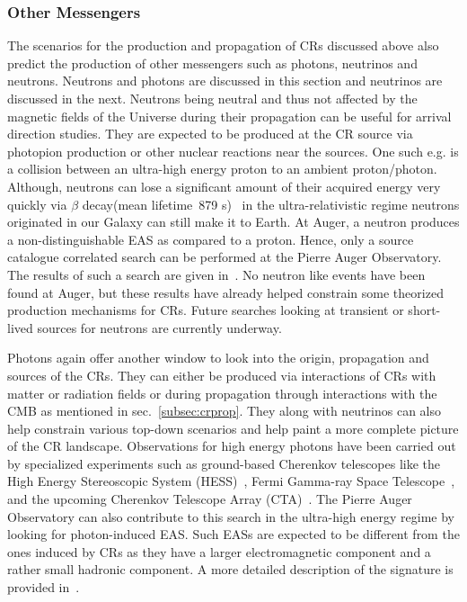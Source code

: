 \subsubsection*{Other Messengers}
\label{subsubsec:CRmessengers}
The scenarios for the production and propagation of CRs discussed above also predict the production of other messengers such as photons, neutrinos and neutrons. Neutrons and photons are discussed in this section and neutrinos are discussed in the next. 
Neutrons being neutral and thus not affected by the magnetic fields of the Universe during their propagation can be useful for arrival direction studies. They are expected to be produced at the CR source via photopion production or other nuclear reactions near the sources. One such e.g. is a collision between an ultra-high energy proton to an ambient proton/photon. Although, neutrons can lose a significant amount of their acquired energy very quickly via $\beta$ decay(mean lifetime~879 s)~\cite{ParticleDataGroup:2024cfk} in the ultra-relativistic regime neutrons originated in our Galaxy can still make it to Earth. At Auger, a neutron produces a non-distinguishable EAS as compared to a proton. Hence, only a source catalogue correlated search can be performed at the Pierre Auger Observatory. The results of such a search are given in~\cite{PierreAuger:2023onx}. No neutron like events have been found at Auger, but these results have already helped constrain some theorized production mechanisms for CRs. Future searches looking at transient or short-lived sources for neutrons are currently underway. 

Photons again offer another window to look into the origin, propagation and sources of the CRs. They can either be produced via interactions of CRs with matter or radiation fields or during propagation through interactions with the CMB as mentioned in sec.~\ref{subsec:crprop}. They along with neutrinos can also help constrain various top-down scenarios and help paint a more complete picture of the CR landscape. Observations for high energy photons have been carried out by specialized experiments such as ground-based Cherenkov telescopes like the High Energy Stereoscopic System (HESS)~\cite{Puhlhofer:2024fjx}, Fermi Gamma-ray Space Telescope~\cite{Thompson_2022}, and the upcoming Cherenkov Telescope Array (CTA)~\cite{2018_CTAO}. The Pierre Auger Observatory can also contribute to this search in the ultra-high energy regime by looking for photon-induced EAS. Such EASs are expected to be different from the ones induced by CRs as they have a larger electromagnetic component and a rather small hadronic component. A more detailed description of the signature is provided in~\cite{universe8110579}. 

